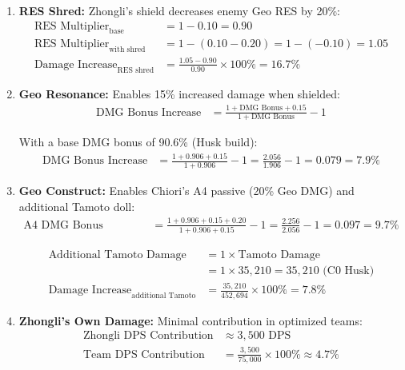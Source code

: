 \documentclass[12pt,a4paper]{article}
\begin{document}
\begin{enumerate}
    \item \textbf{RES Shred:} Zhongli's shield decreases enemy Geo RES by 20\%:
    \begin{align}
    \text{RES Multiplier}_{\text{base}} &= 1 - 0.10 = 0.90 \\
    \text{RES Multiplier}_{\text{with shred}} &= 1 - (0.10 - 0.20) = 1 - (-0.10) = 1.05 \\
    \text{Damage Increase}_{\text{RES shred}} &= \frac{1.05 - 0.90}{0.90} \times 100\% = 16.7\%
    \end{align}
    
    \item \textbf{Geo Resonance:} Enables 15\% increased damage when shielded:
    \begin{align}
    \text{DMG Bonus Increase} &= \frac{1 + \text{DMG Bonus} + 0.15}{1 + \text{DMG Bonus}} - 1
    \end{align}
    
    With a base DMG bonus of 90.6\% (Husk build):
    \begin{align}
    \text{DMG Bonus Increase} &= \frac{1 + 0.906 + 0.15}{1 + 0.906} - 1 = \frac{2.056}{1.906} - 1 = 0.079 = 7.9\%
    \end{align}
    
    \item \textbf{Geo Construct:} Enables Chiori's A4 passive (20\% Geo DMG) and additional Tamoto doll:
    \begin{align}
    \text{A4 DMG Bonus Increase} &= \frac{1 + 0.906 + 0.15 + 0.20}{1 + 0.906 + 0.15} - 1 = \frac{2.256}{2.056} - 1 = 0.097 = 9.7\%
    \end{align}
    
    \begin{align}
    \text{Additional Tamoto Damage} &= 1 \times \text{Tamoto Damage} \\
    &= 1 \times 35,210 = 35,210 \text{ (C0 Husk)} \\
    \text{Damage Increase}_{\text{additional Tamoto}} &= \frac{35,210}{452,694} \times 100\% = 7.8\%
    \end{align}
    
    \item \textbf{Zhongli's Own Damage:} Minimal contribution in optimized teams:
    \begin{align}
    \text{Zhongli DPS Contribution} &\approx 3,500 \text{ DPS} \\
    \text{Team DPS Contribution} &= \frac{3,500}{75,000} \times 100\% \approx 4.7\%
    \end{align}
\end{enumerate}
\end{document}
